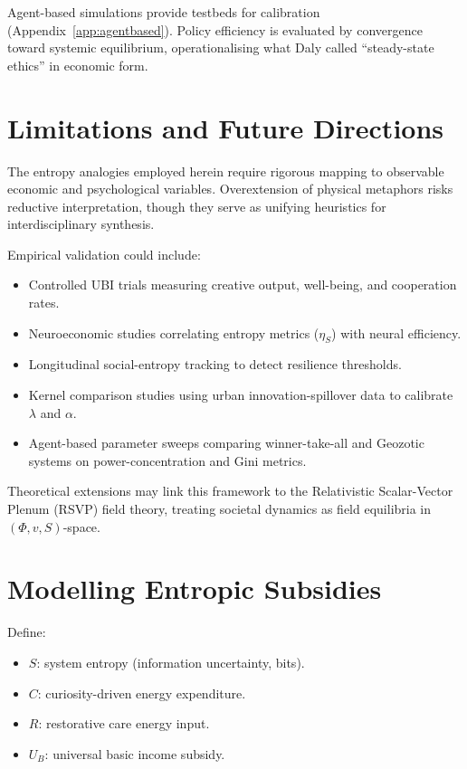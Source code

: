 \documentclass[12pt,a4paper]{article}
\theoremstyle{definition}
\begin{document}
Agent-based simulations provide testbeds for calibration
(Appendix~\ref{app:agentbased}).  Policy efficiency is evaluated by
convergence toward systemic equilibrium, operationalising what Daly called
``steady-state ethics'' in economic form.

\section{Limitations and Future Directions}
\label{sec:limitations}

The entropy analogies employed herein require rigorous mapping to observable
economic and psychological variables.  Overextension of physical metaphors
risks reductive interpretation, though they serve as unifying heuristics for
interdisciplinary synthesis.

Empirical validation could include:

\begin{itemize}[leftmargin=*]
  \item Controlled UBI trials measuring creative output, well-being, and
    cooperation rates.
  \item Neuroeconomic studies correlating entropy metrics ($\eta_S$) with
    neural efficiency.
  \item Longitudinal social-entropy tracking to detect resilience thresholds.
  \item Kernel comparison studies using urban innovation-spillover data to
    calibrate $\lambda$ and $\alpha$.
  \item Agent-based parameter sweeps comparing winner-take-all and Geozotic
    systems on power-concentration and Gini metrics.
\end{itemize}

Theoretical extensions may link this framework to the Relativistic
Scalar-Vector Plenum (RSVP) field theory, treating societal dynamics as field
equilibria in $(\Phi, v, S)$-space.

\appendix

\section{Modelling Entropic Subsidies}
\label{app:entropic}

Define:
\begin{itemize}[leftmargin=*]
  \item $S$: system entropy (information uncertainty, bits).
  \item $C$: curiosity-driven energy expenditure.
  \item $R$: restorative care energy input.
  \item $U_B$: universal basic income subsidy.
\end{itemize}
\end{document}
